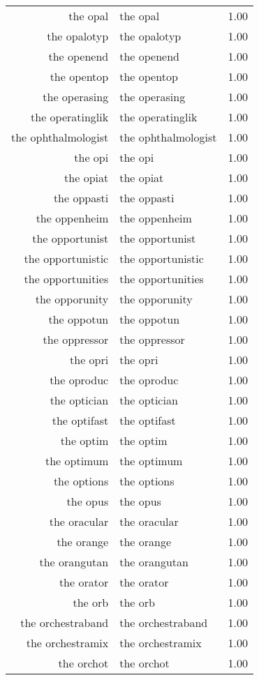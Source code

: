 \begin{table}[ht]
\begin{tabular}{rlr}
  the opal & the opal & 1.00 \\ 
  the opalotyp & the opalotyp & 1.00 \\ 
  the openend & the openend & 1.00 \\ 
  the opentop & the opentop & 1.00 \\ 
  the operasing & the operasing & 1.00 \\ 
  the operatinglik & the operatinglik & 1.00 \\ 
  the ophthalmologist & the ophthalmologist & 1.00 \\ 
  the opi & the opi & 1.00 \\ 
  the opiat & the opiat & 1.00 \\ 
  the oppasti & the oppasti & 1.00 \\ 
  the oppenheim & the oppenheim & 1.00 \\ 
  the opportunist & the opportunist & 1.00 \\ 
  the opportunistic & the opportunistic & 1.00 \\ 
  the opportunities & the opportunities & 1.00 \\ 
  the opporunity & the opporunity & 1.00 \\ 
  the oppotun & the oppotun & 1.00 \\ 
  the oppressor & the oppressor & 1.00 \\ 
  the opri & the opri & 1.00 \\ 
  the oproduc & the oproduc & 1.00 \\ 
  the optician & the optician & 1.00 \\ 
  the optifast & the optifast & 1.00 \\ 
  the optim & the optim & 1.00 \\ 
  the optimum & the optimum & 1.00 \\ 
  the options & the options & 1.00 \\ 
  the opus & the opus & 1.00 \\ 
  the oracular & the oracular & 1.00 \\ 
  the orange & the orange & 1.00 \\ 
  the orangutan & the orangutan & 1.00 \\ 
  the orator & the orator & 1.00 \\ 
  the orb & the orb & 1.00 \\ 
  the orchestraband & the orchestraband & 1.00 \\ 
  the orchestramix & the orchestramix & 1.00 \\ 
  the orchot & the orchot & 1.00 \\ 

\end{tabular}
\end{table}
